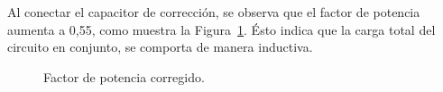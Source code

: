 Al conectar el capacitor de corrección, se observa que el factor 
de potencia aumenta a 0,55, como muestra la Figura~\ref{fig:FDPCorregidoExp3}. 
Ésto indica que la carga total del circuito en conjunto, se comporta de manera inductiva.

 \begin{figure}[H]
  \centering
  \caption{Factor de potencia corregido.}
  \label{fig:FDPCorregidoExp3}
\end{figure}
